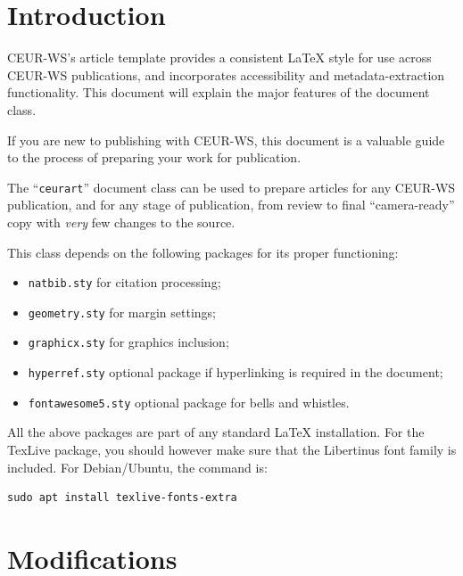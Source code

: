 \documentclass[%
]{ceurart}
\begin{document}
\maketitle

\section{Introduction}

CEUR-WS's article template provides a consistent \LaTeX{} style for use across CEUR-WS publications, and incorporates accessibility and metadata-extraction functionality.
This document will explain the major features of the document class.

If you are new to publishing with CEUR-WS, this document is a valuable guide to the process of preparing your work for publication.

The ``\verb|ceurart|'' document class can be used to prepare articles for any CEUR-WS publication, and for any stage of publication, from review to final ``camera-ready'' copy with {\itshape very} few changes to the source.

This class depends on the following packages for its proper functioning:

\begin{itemize}
\item
\texttt{natbib.sty}
 for citation processing;
\item
\texttt{geometry.sty}
 for margin settings;
\item
\texttt{graphicx.sty}
 for graphics inclusion;
\item
\texttt{hyperref.sty}
 optional package if hyperlinking is required in the document;
\item
\texttt{fontawesome5.sty}
 optional package for bells and whistles.
\end{itemize}

All the above packages are part of any standard \LaTeX{} installation.
For the TexLive package, you should however make sure that the Libertinus font family is included.
For Debian/Ubuntu, the command is:
\begin{verbatim}
sudo apt install texlive-fonts-extra
\end{verbatim}

\section{Modifications}
\end{document}
